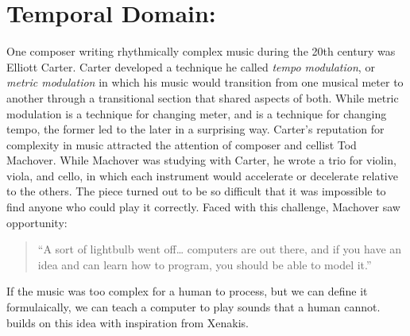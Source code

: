 \clearpage
\chapter{Temporal Domain: \polytempic}
\label{ch:polytempic}

One composer writing rhythmically complex music during the 20th
century was Elliott Carter. Carter developed a technique he called
\textit{tempo modulation}, or \textit{metric modulation} in which his
music would transition from one musical meter to another through a
transitional section that shared aspects of both. While metric
modulation is a technique for changing meter, and \polytempic is a
technique for changing tempo, the former led to the later in a
surprising way. Carter's reputation for complexity in music attracted
the attention of composer and cellist Tod Machover. While Machover was
studying with Carter, he wrote a trio for violin, viola, and cello, in
which each instrument would accelerate or decelerate relative to the
others. The piece turned out to be so difficult that it was impossible
to find anyone who could play it correctly. Faced with this challenge,
Machover saw opportunity:
\begin{quotation}``A sort of lightbulb went off\ldots{} computers are out
  there, and if you have an idea and can learn how to program, you
  should be able to model it.''\cite{Fein2014}
\end{quotation}
If the music was too complex for a human to process, but we can define
it formulaically, we can teach a computer to play sounds that a human
cannot. \polytempic builds on this idea with inspiration from Xenakis.

